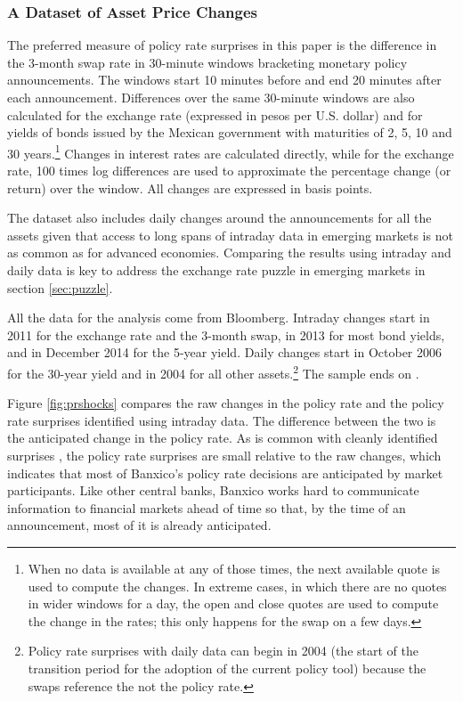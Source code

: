\documentclass[a4paper,12pt]{article} 		%
\begin{document}
\sectitlespace
\subsubsection{A Dataset of Asset Price Changes} \label{sec:dataset}
\sectitlespace
The preferred measure of policy rate surprises in this paper is the difference in the 3-month swap rate in 30-minute windows bracketing monetary policy announcements. The windows start 10 minutes before and end 20 minutes after each announcement. Differences over the same 30-minute windows are also calculated for the exchange rate (expressed in pesos per U.S. dollar) and for yields of bonds issued by the Mexican government with maturities of 2, 5, 10 and 30 years.\footnote{When no data is available at any of those times, the next available quote is used to compute the changes. In extreme cases, in which there are no quotes in wider windows for a day, the open and close quotes are used to compute the change in the rates; this only happens for the swap on a few days.} Changes in interest rates are calculated directly, while for the exchange rate, 100 times log differences are used to approximate the percentage change (or return) over the window. All changes are expressed in basis points. 

The dataset also includes daily changes around the announcements for all the assets given that access to long spans of intraday data in emerging markets is not as common as for advanced economies. Comparing the results using intraday and daily data is key to address the exchange rate puzzle in emerging markets \parencite{Kohlscheen:2014} in section \ref{sec:puzzle}.

All the data for the analysis come from Bloomberg. Intraday changes start in 2011 for the exchange rate and the 3-month swap, in 2013 for most bond yields, and in December 2014 for the 5-year yield. Daily changes start in October 2006 for the 30-year yield and in 2004 for all other assets.\footnote{Policy rate surprises with daily data can begin in 2004 (the start of the transition period for the adoption of the current policy tool) because the swaps reference the \tiie{} not the policy rate.} The sample ends on \lastobsfx. 

Figure \ref{fig:prshocks} compares the raw changes in the policy rate and the policy rate surprises identified using intraday data. The difference between the two is the anticipated change in the policy rate. As is common with cleanly identified surprises \parencite{NakamuraSteinsson:2018JEP}, the policy rate surprises are small relative to the raw changes, which indicates that most of Banxico's policy rate decisions are anticipated by market participants. Like other central banks, Banxico works hard to communicate information to financial markets ahead of time so that, by the time of an announcement, most of it is already anticipated. 
\end{document}
